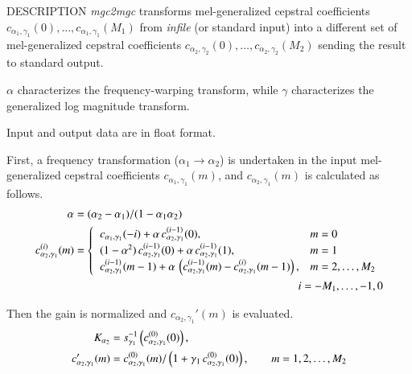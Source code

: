\begin{synopsis}
 \item [mgc2mgc] [ --m $M_1$ ] [ --a $A_1$ ] [ --g $G_1$ ] [ --c
   $C_1$ ] [ --n ] [ --u ]
 \item [\ ~~~~~~~~~~~] [ --M $M_2$ ] [ --A $A_2$ ] [ --G $G_2$ ]
   [ --C $C_2$ ] [ --N ] [ --U ] [ {\em infile} ] 
\end{synopsis}

\begin{qsection}{DESCRIPTION}
{\em mgc2mgc} transforms mel-generalized cepstral coefficients
$c_{\alpha_1,\gamma_1}(0), \dots, c_{\alpha_1,\gamma_1}(M_1)$
from {\em infile} (or standard input) 
into a different set of mel-generalized cepstral coefficients
$c_{\alpha_2,\gamma_2}(0), \dots, c_{\alpha_2,\gamma_2}(M_2)$
sending the result to standard output.

$\alpha$ characterizes the frequency-warping transform,
while $\gamma$ characterizes the generalized log magnitude transform.

Input and output data are in float format.

First, a frequency transformation ($\alpha_1 \rightarrow \alpha_2$)
is undertaken in the input mel-generalized cepstral
coefficients $c_{\alpha_1,\gamma_1}(m)$,
and $c_{\alpha_2,\gamma_1}(m)$ is calculated as follows.
\begin{align} 
\alpha &= (\alpha_2-\alpha_1)/(1-\alpha_1\alpha_2) \notag \\
c_{\alpha_2,\gamma_1}^{(i)}(m) &= \begin{cases}
          \;\; c_{\alpha_1,\gamma_1}(-i)
            +\alpha\,c_{\alpha_2,\gamma_1}^{(i-1)}(0), &  m=0 \\
          \;\; (1-\alpha^2)\,c_{\alpha_2,\gamma_1}^{(i-1)}(0)
            +\alpha\,c_{\alpha_2,\gamma_1}^{(i-1)}(1), &  m=1 \\
          \;\; c_{\alpha_2,\gamma_1}^{(i-1)}(m-1) 
            +\alpha\, \left(c_{\alpha_2,\gamma_1}^{(i-1)}(m)
            -c_{\alpha_2,\gamma_1}^{(i)}(m-1)\right), &   m=2,\dots,M_2
         \end{cases} \notag \\
&\hspace{70mm} i = -M_1,\dots,-1,0 \notag
\end{align}

Then the gain is normalized and $c_{\alpha_2,\gamma_1}'(m)$ 
is evaluated.
\begin{align}
K_{\alpha_2} &= 
        s_{\gamma_1}^{-1}\left(c_{\alpha_2,\gamma_1}^{(0)}(0)\right), \notag \\ 
c_{\alpha_2,\gamma_1}'(m) &=
          c_{\alpha_2,\gamma_1}^{(0)}(m)/\left(1+\gamma_1\,
          c_{\alpha_2,\gamma_1}^{(0)}(0)\right), \qquad m = 1,2,\dots, M_2 \notag
\end{align}


\end{qsection}
